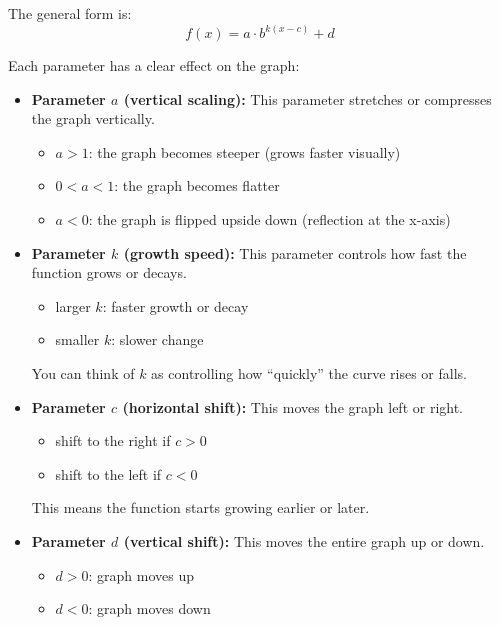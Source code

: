 The general form is:
\begin{equation}
    f(x) = a \cdot b^{k(x-c)} + d
\end{equation}

Each parameter has a clear effect on the graph:

\begin{itemize}
    \item \textbf{Parameter $a$ (vertical scaling):}  
    This parameter stretches or compresses the graph vertically.
    \begin{itemize}
        \item $a > 1$: the graph becomes steeper (grows faster visually)
        \item $0 < a < 1$: the graph becomes flatter
        \item $a < 0$: the graph is flipped upside down (reflection at the x-axis)
    \end{itemize}

    \item \textbf{Parameter $k$ (growth speed):}  
    This parameter controls how fast the function grows or decays.
    \begin{itemize}
        \item larger $k$: faster growth or decay
        \item smaller $k$: slower change
    \end{itemize}
    You can think of $k$ as controlling how ``quickly'' the curve rises or falls.

    \item \textbf{Parameter $c$ (horizontal shift):}  
    This moves the graph left or right.
    \begin{itemize}
        \item shift to the right if $c > 0$
        \item shift to the left if $c < 0$
    \end{itemize}
    This means the function starts growing earlier or later.

    \item \textbf{Parameter $d$ (vertical shift):}  
    This moves the entire graph up or down.
    \begin{itemize}
        \item $d > 0$: graph moves up
        \item $d < 0$: graph moves down
    \end{itemize}
\end{itemize}


